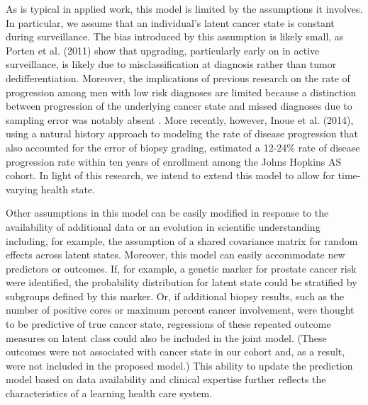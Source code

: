 \documentclass[12pt, letterpaper]{article}
\begin{document}
As is typical in applied work, this model is limited by the assumptions it involves. In particular, we assume that an individual's latent cancer state is constant during surveillance. The bias introduced by this assumption is likely small, as Porten et al. (2011)\nocite{Porten2011} show that upgrading, particularly early on in active surveillance, is likely due to misclassification at diagnosis rather than tumor dedifferentiation. Moreover, the implications of previous research on the rate of progression among men with low risk diagnoses are limited because a distinction between progression of the underlying cancer state and missed diagnoses due to sampling error was notably absent \cite{Tseng2010}. More recently, however, Inoue et al. (2014), using a natural history approach to modeling the rate of disease progression that also accounted for the error of biopsy grading, estimated a 12-24$\%$ rate of disease progression rate within ten years of enrollment among the Johns Hopkins AS cohort. In light of this research, we intend to extend this model to allow for time-varying health state. %

Other assumptions in this model can be easily modified in response to the availability of additional data or an evolution in scientific understanding including, for example, the assumption of a shared covariance matrix for random effects across latent states. Moreover, this model can easily accommodate new predictors or outcomes. If, for example, a genetic marker for prostate cancer risk were identified, the probability distribution for latent state could be stratified by subgroups defined by this marker. Or, if additional biopsy results, such as the number of positive cores or maximum percent cancer involvement, were thought to be predictive of true cancer state, regressions of these repeated outcome measures on latent class could also be included in the joint model. (These outcomes were not associated with cancer state in our cohort and, as a result, were not included in the proposed model.) This ability to update the prediction model based on data availability and clinical expertise further reflects the characteristics of a learning health care system. 
\end{document}
